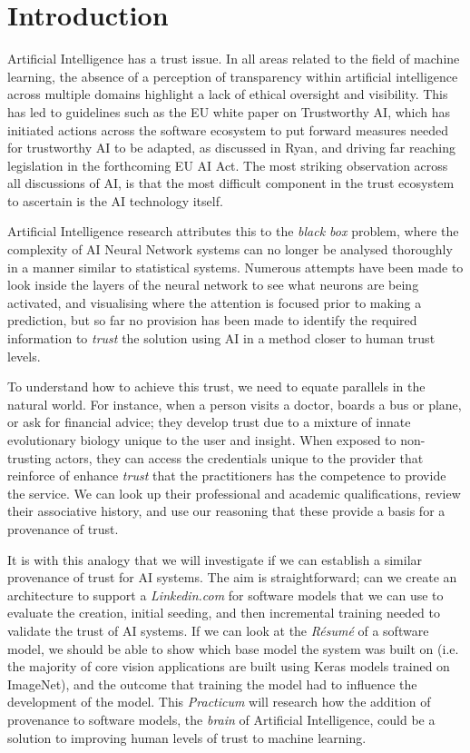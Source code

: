 \section{Introduction}
Artificial Intelligence has a trust issue. In all areas related to the field of machine learning, the absence of a perception of transparency within artificial intelligence across multiple domains highlight a lack of ethical oversight and visibility. This has led to guidelines such as the EU white paper on Trustworthy AI\cite{high-levelexpertgrouponaiEthicsGuidelinesTrustworthy2019}, which has initiated actions across the software ecosystem to put forward measures needed for trustworthy AI to be adapted, as discussed in Ryan\cite{ryanAIWeTrust2020}, and driving far reaching legislation in the forthcoming EU AI Act. The most striking observation across all discussions of AI, is that the most difficult component in the trust ecosystem to ascertain is the AI technology itself.

Artificial Intelligence research attributes this to the \textit{black box} problem\cite{adadiPeekingBlackBoxSurvey2018}, where the complexity of AI Neural Network systems can no longer be analysed thoroughly in a manner similar to statistical systems. Numerous attempts have been made to look inside the layers of the neural network to see what neurons are being activated\cite{kimInterpretabilityFeatureAttribution2018}, and visualising where the attention is focused prior to making a prediction, but so far no provision has been made to identify the required information to \textit{trust} the solution using AI in a method closer to human trust levels.

To understand how to achieve this trust, we need to equate parallels in the natural world. For instance, when a person visits a doctor, boards a bus or plane, or ask for financial advice; they develop trust due to a mixture of innate evolutionary biology unique to the user and insight. When exposed to non-trusting actors, they can access the credentials unique to the provider that reinforce of enhance \textit{trust} that the practitioners has the competence to provide the service. We can look up their professional and academic qualifications, review their associative history, and use our reasoning that these provide a basis for a provenance of trust.

It is with this analogy that we will investigate if we can establish a similar provenance of trust for AI systems. The aim is straightforward; can we create an architecture to support a \textit{Linkedin.com} for software models that we can use to evaluate the creation, initial seeding, and then incremental training needed to validate the trust of AI systems. If we can look at the \textit{Résumé} of a software model, we should be able to show which base model the system was built on (i.e. the majority of core vision applications are built using Keras models trained on ImageNet\cite{dengImageNetLargescaleHierarchical2009}), and the outcome that training the model had to influence the development of the model. This \textit{Practicum} will research how the addition of provenance to software models, the \textit{brain} of Artificial Intelligence, could be a solution to improving human levels of trust\cite{mcleodTrust2020} to machine learning.

